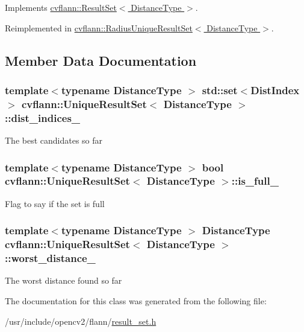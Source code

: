 Implements \hyperlink{classcvflann_1_1ResultSet_a7d0240d65865aace32c1422095ed1094}{cvflann\-::\-Result\-Set$<$ Distance\-Type $>$}.



Reimplemented in \hyperlink{classcvflann_1_1RadiusUniqueResultSet_a07cc3d2c8825a1ff9c56b6d050fc4c50}{cvflann\-::\-Radius\-Unique\-Result\-Set$<$ Distance\-Type $>$}.



\subsection{Member Data Documentation}
\hypertarget{classcvflann_1_1UniqueResultSet_a72cd438bad9e7924742ba2b7437a199b}{
\subsubsection[{dist\-\_\-indices\-\_\-}]{\setlength{\rightskip}{0pt plus 5cm}template$<$typename Distance\-Type $>$ std\-::set$<${\bf Dist\-Index}$>$ {\bf cvflann\-::\-Unique\-Result\-Set}$<$ Distance\-Type $>$\-::dist\-\_\-indices\-\_\-\hspace{0.3cm}{\ttfamily [protected]}}}\label{classcvflann_1_1UniqueResultSet_a72cd438bad9e7924742ba2b7437a199b}
The best candidates so far \hypertarget{classcvflann_1_1UniqueResultSet_af71a1c29b71e041b32dd1007db3418ff}{
\subsubsection[{is\-\_\-full\-\_\-}]{\setlength{\rightskip}{0pt plus 5cm}template$<$typename Distance\-Type $>$ bool {\bf cvflann\-::\-Unique\-Result\-Set}$<$ Distance\-Type $>$\-::is\-\_\-full\-\_\-\hspace{0.3cm}{\ttfamily [protected]}}}\label{classcvflann_1_1UniqueResultSet_af71a1c29b71e041b32dd1007db3418ff}
Flag to say if the set is full \hypertarget{classcvflann_1_1UniqueResultSet_ae4aeffc73377b192786837dd7a3360ab}{
\subsubsection[{worst\-\_\-distance\-\_\-}]{\setlength{\rightskip}{0pt plus 5cm}template$<$typename Distance\-Type $>$ Distance\-Type {\bf cvflann\-::\-Unique\-Result\-Set}$<$ Distance\-Type $>$\-::worst\-\_\-distance\-\_\-\hspace{0.3cm}{\ttfamily [protected]}}}\label{classcvflann_1_1UniqueResultSet_ae4aeffc73377b192786837dd7a3360ab}
The worst distance found so far 

The documentation for this class was generated from the following file\-:\begin{DoxyCompactItemize}
\item 
/usr/include/opencv2/flann/\hyperlink{result__set_8h}{result\-\_\-set.\-h}\end{DoxyCompactItemize}

